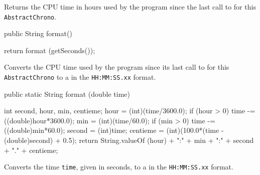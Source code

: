 \begin{tabb}
  Returns the CPU time in hours used by the program since the last call to
   for this \texttt{AbstractChrono}.
 \end{tabb}
\begin{htmlonly}
\end{htmlonly}
\begin{code}

   public String format()\begin{hide} {
      return format (getSeconds());
   }\end{hide}
\end{code}
  \begin{tabb}  Converts the CPU time used by the program since its last
   call to  for this \texttt{Abstract\-Chrono} to a
   in  the \texttt{HH:MM:SS.xx} format.
  \end{tabb}
\begin{htmlonly}
\end{htmlonly}
\begin{code}

   public static String format (double time)\begin{hide} {
      int second, hour, min, centieme;
      hour = (int)(time/3600.0);
      if (hour > 0) time -= ((double)hour*3600.0);
      min = (int)(time/60.0);
      if (min > 0) time -= ((double)min*60.0);
      second = (int)time;
      centieme = (int)(100.0*(time - (double)second) + 0.5);
      return String.valueOf (hour) + ":" +
                      min + ":" +
                      second + "." +
                      centieme;
   }\end{hide}
\end{code}
  \begin{tabb}  Converts the time \texttt{time}, given in seconds, to a
   in the \texttt{HH:MM:SS.xx} format.
  \end{tabb}
\begin{htmlonly}
\end{htmlonly}
\begin{code}\begin{hide}
}\end{hide}
\end{code}

